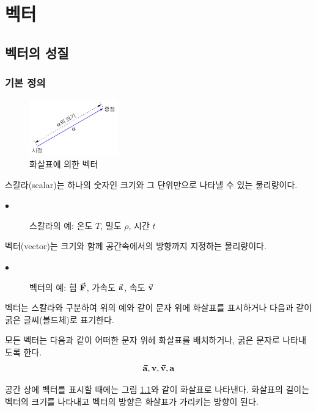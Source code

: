 \chapter[\quad 벡터]{벡터}


\section{벡터의 성질}

\subsection{기본 정의}

\begin{figure}
  \centering
  \includegraphics[width=0.34\textwidth]{images/fig1-1}
  \caption{화살표에 의한 벡터}
  \label{fig:arrowvector}
\end{figure}

스칼라(scalar)는 하나의 숫자인 크기와 그 단위만으로 나타낼 수 있는 물리량이다.
\begin{description}\item[$\bullet$]{스칼라의 예:} 온도 $T$, 밀도 $\rho$, 시간 $t$ \end{description}
벡터(vector)는 크기와 함께 공간속에서의 방향까지 지정하는 물리량이다.
\begin{description}\item[$\bullet$]{벡터의 예:} 힘 $\va{F}$, 가속도 $\va{a}$, 속도 $\va{v}$ \end{description}

벡터는 스칼라와 구분하여 위의 예와 같이 문자 위에 화살표를 표시하거나 다음과 같이 굵은 글씨(볼드체)로 표기한다.

\begin{keypoint}
  모든 벡터는 다음과 같이 어떠한 문자 위헤 화살표를 배치하거나, 굵은 문자로 나타내도록 한다.
  $$\va{a}, \vb{v}, \va{v}, \vb{a}$$
\end{keypoint}


공간 상에 벡터를 표시할 때에는 그림 \ref{fig:arrowvector}와 같이 화살표로 나타낸다. 화살표의 길이는 벡터의 크기를 나타내고 벡터의 방향은 화살표가 가리키는 방향이 된다.

